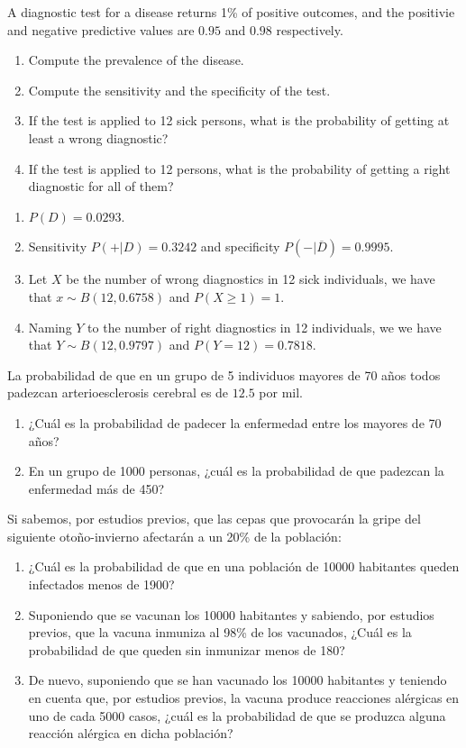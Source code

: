{A diagnostic test for a disease returns 1\% of positive outcomes, and the positivie and negative predictive values are $0.95$ and $0.98$ respectively. 
\begin{enumerate}
\item Compute the prevalence of the disease.
\item Compute the sensitivity and the specificity of the test.
\item If the test is applied to 12 sick persons, what is the probability of getting at least a wrong diagnostic?
\item If the test is applied to 12 persons, what is the probability of getting a right diagnostic for all of them?
\end{enumerate}
} 
{
\begin{enumerate}
\item $P(D)=0.0293$.
\item Sensitivity $P(+|D)=0.3242$ and specificity $P(-|\overline D)=0.9995$. 
\item Let $X$ be the number of wrong diagnostics in 12 sick individuals, we have that $x\sim B(12,0.6758)$ and $P(X\geq 1)=1$. 
\item Naming $Y$ to the number of right diagnostics in 12 individuals, we we have that $Y\sim B(12,0.9797)$ and $P(Y=12)=0.7818$. 
\end{enumerate}
}
{
}


{La probabilidad de que en un grupo de 5 individuos mayores de 70 años todos padezcan arterioesclerosis cerebral es de $12.5$ por mil.
\begin{enumerate}
\item ¿Cuál es la probabilidad de padecer la enfermedad entre los mayores de 70 años?
\item En un grupo de 1000 personas, ¿cuál es la probabilidad de que padezcan la enfermedad más de 450?
\end{enumerate}
} 
{
}
{
}


{Si sabemos, por estudios previos, que las cepas que provocarán la gripe del siguiente otoño-invierno afectarán a un 20\% de la
población:
\begin{enumerate}
\item ¿Cuál es la probabilidad de que en una población de 10000 habitantes queden infectados menos de 1900?
\item Suponiendo que se vacunan los 10000 habitantes y sabiendo, por estudios previos, que la vacuna inmuniza al 98\% de los vacunados,
¿Cuál es la probabilidad de que queden sin inmunizar menos de 180?
\item De nuevo, suponiendo que se han vacunado los 10000 habitantes y teniendo en cuenta que, por estudios previos, la vacuna produce
reacciones alérgicas en uno de cada 5000 casos, ¿cuál es la probabilidad de que se produzca alguna reacción alérgica en dicha población?
\end{enumerate}
} 
{
}
{
}


